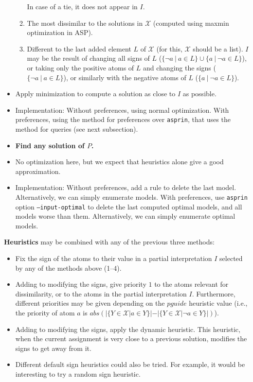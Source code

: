\documentclass[a4paper,10pt]{article}
\begin{document}
\begin{itemize}
\begin{enumerate}
    In case of a tie, it does not appear in $I$.
    \item
    The most dissimilar to the solutions in $\mathcal{X}$ (computed using maxmin optimization in ASP).
    \item
    Different to the last added element $L$ of $\mathcal{X}$ (for this, $\mathcal{X}$ should be a list).
    $I$ may be the result of changing all signs of $L$ ($\{ \neg a \ | \ a \in L\} \cup \{ a \ | \ \neg a \in L\}$), 
    or taking only the positive atoms of $L$ and changing the signs ($\{ \neg a \ | \ a \in L\}$), 
    or similarly with the negative atoms of $L$ ($\{ a \ | \ \neg a \in L\}$).
\end{enumerate}
\item
Apply minimization to compute a solution as close to $I$ as possible.
\item
Implementation: 
Without preferences, using normal optimization.
With preferences, using the method for preferences over \texttt{asprin}, 
that uses the method for queries (see next subsection). 
\item
\textbf{Find any solution of $P$.}
\item
No optimization here, but we expect that heuristics alone give a good approximation.
\item
Implementation:
Without preferences, add a rule to delete the last model.
Alternatively, we can simply enumerate models.
With preferences, use \texttt{asprin} option \texttt{--input-optimal} 
to delete the last computed optimal models, 
and all models worse than them.
Alternatively, we can simply enumerate optimal models.
\end{itemize}

\textbf{Heuristics} may be combined with any of the previous three methods:
\begin{itemize}
\item
Fix the sign of the atoms to their value in a partial interpretation $I$ selected by any of the methods above (1--4).
\item
Adding to modifying the signs, 
give priority $1$ to the atoms relevant for dissimilarity, 
or to the atoms in the partial interpretation $I$.
Furthermore, different priorities may be given depending on the $pguide$ heuristic value
(i.e., the priority of atom $a$ is $abs(|\{Y \in \mathcal{X} | a \in Y\}| - |\{Y \in \mathcal{X} | \neg a \in Y\}|)$).
\item
Adding to modifying the signs, apply the dynamic heuristic. 
This heuristic, when the current assignment is very close to a previous solution, 
modifies the signs to get away from it.
\item
Different default sign heuristics could also be tried. For example, it would be interesting to try a random sign heuristic.
\end{itemize}
\end{document}
